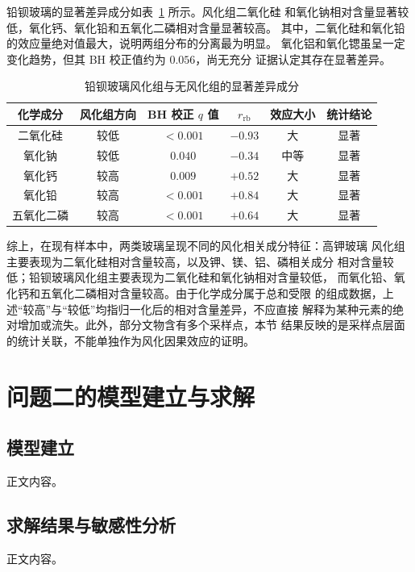 \documentclass[UTF8,a4paper,12pt,fontset=fandol]{ctexart}
\begin{document}
铅钡玻璃的显著差异成分如表~\ref{tab:q1b-pbba} 所示。风化组二氧化硅
和氧化钠相对含量显著较低，氧化钙、氧化铅和五氧化二磷相对含量显著较高。
其中，二氧化硅和氧化铅的效应量绝对值最大，说明两组分布的分离最为明显。
氧化铝和氧化锶虽呈一定变化趋势，但其 BH 校正值约为 $0.056$，尚无充分
证据认定其存在显著差异。

\begin{table}[H]
    \centering
    \caption{铅钡玻璃风化组与无风化组的显著差异成分}
    \label{tab:q1b-pbba}
    \small
    \begin{tabular}{cccccc}
        \toprule
        化学成分 & 风化组方向 & BH 校正 $q$ 值 & $r_{\mathrm{rb}}$ & 效应大小 & 统计结论 \\
        \midrule
        二氧化硅       & 较低 & $<0.001$ & $-0.93$ & 大   & 显著 \\
        氧化钠         & 较低 & $0.040$  & $-0.34$ & 中等 & 显著 \\
        氧化钙         & 较高 & $0.009$  & $+0.52$ & 大   & 显著 \\
        氧化铅         & 较高 & $<0.001$ & $+0.84$ & 大   & 显著 \\
        五氧化二磷     & 较高 & $<0.001$ & $+0.64$ & 大   & 显著 \\
        \bottomrule
    \end{tabular}
\end{table}

综上，在现有样本中，两类玻璃呈现不同的风化相关成分特征：高钾玻璃
风化组主要表现为二氧化硅相对含量较高，以及钾、镁、铝、磷相关成分
相对含量较低；铅钡玻璃风化组主要表现为二氧化硅和氧化钠相对含量较低，
而氧化铅、氧化钙和五氧化二磷相对含量较高。由于化学成分属于总和受限
的组成数据，上述“较高”与“较低”均指归一化后的相对含量差异，不应直接
解释为某种元素的绝对增加或流失。此外，部分文物含有多个采样点，本节
结果反映的是采样点层面的统计关联，不能单独作为风化因果效应的证明。



\section{问题二的模型建立与求解}
\subsection{模型建立}
正文内容。

\subsection{求解结果与敏感性分析}
正文内容。
\end{document}
